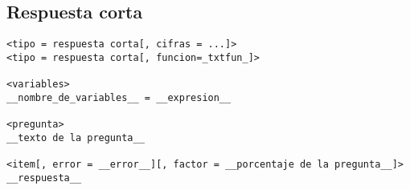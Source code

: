 \documentclass[12pt]{article}
\theoremstyle{definition}
\begin{document}
\subsection{Respuesta corta}

\small
\begin{verbatim}
<tipo = respuesta corta[, cifras = ...]>
<tipo = respuesta corta[, funcion=_txtfun_]>

<variables>
__nombre_de_variables__ = __expresion__

<pregunta>
__texto de la pregunta__

<item[, error = __error__][, factor = __porcentaje de la pregunta__]>
__respuesta__
\end{verbatim}
\normalsize
\end{document}

